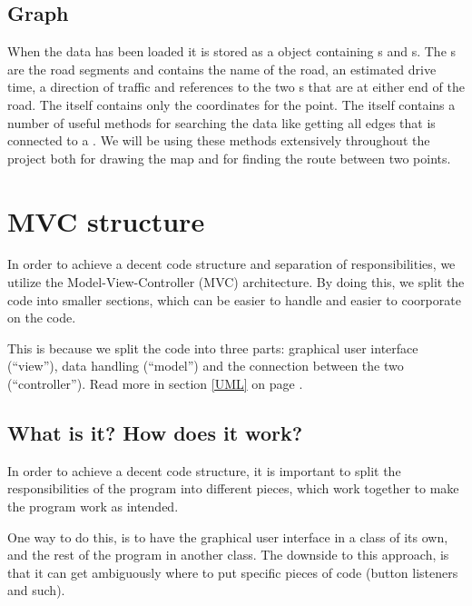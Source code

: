\subsection{Graph}
\label{BG-DS-G}
When the data has been loaded it is stored as a  object containing 
s and s. The s are the 
road segments and contains the name of the road, an estimated drive time, 
a direction of traffic and references to the two s that are at 
either end of the road.  The  itself contains only the coordinates 
for the point. The  itself contains a number of useful methods for 
searching the data like getting all edges that is connected to a . 
We will be using these methods extensively throughout the project both for 
drawing the map and for finding the route between two points.

\section{MVC structure}
\label{BG-MVC}
In order to achieve a decent code structure and separation of responsibilities, 
we utilize the Model-View-Controller (MVC) architecture. By doing this, we split 
the code into smaller sections, which can be easier to handle and easier to 
coorporate on the code.

This is because we split the code into three parts: graphical user interface 
(``view''), data handling (``model'') and the connection between the two 
(``controller''). Read more in section \ref{UML}  on 
page \pageref{UML}.

\subsection{What is it? How does it work?}
In order to achieve a decent code structure, it is important to split the 
responsibilities of the program into different pieces, which work together 
to make the program work as intended.

One way to do this, is to have the graphical user interface in a class of its
own, and the rest of the program in another class. The downside to this
approach, is that it can get ambiguously where to put specific pieces of code
(button listeners and such).

